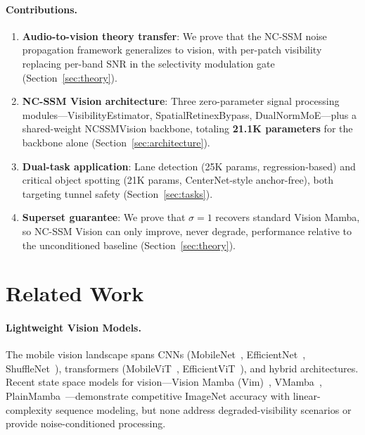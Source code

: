\documentclass[10pt,twocolumn,letterpaper]{article}
\begin{document}
\paragraph{Contributions.}
\begin{enumerate}
\setlength\itemsep{0pt}
\item \textbf{Audio-to-vision theory transfer}: We prove that the NC-SSM noise propagation framework generalizes to vision, with per-patch visibility replacing per-band SNR in the selectivity modulation gate (Section~\ref{sec:theory}).
\item \textbf{NC-SSM Vision architecture}: Three zero-parameter signal processing modules---VisibilityEstimator, SpatialRetinexBypass, DualNormMoE---plus a shared-weight NCSSMVision backbone, totaling \textbf{21.1K parameters} for the backbone alone (Section~\ref{sec:architecture}).
\item \textbf{Dual-task application}: Lane detection (25K params, regression-based) and critical object spotting (21K params, CenterNet-style anchor-free), both targeting tunnel safety (Section~\ref{sec:tasks}).
\item \textbf{Superset guarantee}: We prove that $\sigma=1$ recovers standard Vision Mamba, so NC-SSM Vision can only improve, never degrade, performance relative to the unconditioned baseline (Section~\ref{sec:theory}).
\end{enumerate}


\section{Related Work}
\label{sec:related}

\paragraph{Lightweight Vision Models.}
The mobile vision landscape spans CNNs (MobileNet~\cite{howard2019searching}, EfficientNet~\cite{tan2019efficientnet}, ShuffleNet~\cite{zhang2018shufflenet}), transformers (MobileViT~\cite{mehta2022mobilevit}, EfficientViT~\cite{cai2023efficientvit}), and hybrid architectures.
Recent state space models for vision---Vision Mamba (Vim)~\cite{zhu2024visionmamba}, VMamba~\cite{liu2024vmamba}, PlainMamba~\cite{yang2024plainmamba}---demonstrate competitive ImageNet accuracy with linear-complexity sequence modeling, but none address degraded-visibility scenarios or provide noise-conditioned processing.
\end{document}
